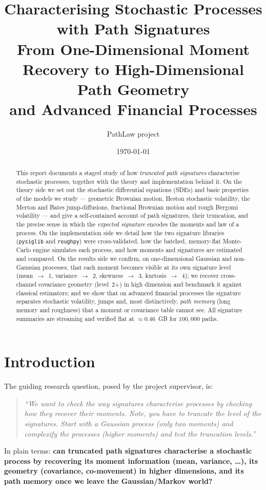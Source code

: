 \documentclass[11pt]{article}
\title{\textbf{Characterising Stochastic Processes with Path Signatures}\\[4pt]
\large From One-Dimensional Moment Recovery to High-Dimensional Path Geometry\\
and Advanced Financial Processes}
\author{PathLaw project}
\date{\today}
\newcommand{\code}[1]{\texttt{#1}}
\begin{document}
\maketitle

\begin{abstract}
This report documents a staged study of how \emph{truncated path signatures}
characterise stochastic processes, together with the theory and implementation
behind it. On the theory side we set out the stochastic differential equations
(SDEs) and basic properties of the models we study --- geometric Brownian motion,
Heston stochastic volatility, the Merton and Bates jump-diffusions, fractional
Brownian motion and rough Bergomi volatility --- and give a self-contained account
of path signatures, their truncation, and the precise sense in which the
\emph{expected signature} encodes the moments and law of a process. On the
implementation side we detail how the two signature libraries (\code{pysiglib} and
\code{roughpy}) were cross-validated, how the batched, memory-flat Monte-Carlo
engine simulates each process, and how moments and signatures are estimated and
compared. On the results side we confirm, on one-dimensional Gaussian and
non-Gaussian processes, that each moment becomes visible at its own signature
level (mean~$\to$~1, variance~$\to$~2, skewness~$\to$~3, kurtosis~$\to$~4); we
recover cross-channel covariance geometry (level~2+) in high dimension and
benchmark it against classical estimators; and we show that on advanced financial
processes the signature separates stochastic volatility, jumps and, most
distinctively, \emph{path memory} (long memory and roughness) that a moment or
covariance table cannot see. All signature summaries are streaming and verified
flat at $\approx 0.46$~GB for $100{,}000$ paths.
\end{abstract}

\tableofcontents

\section{Introduction}
The guiding research question, posed by the project supervisor, is:
\begin{quote}
\emph{``We want to check the way signatures characterise processes by checking
how they recover their moments. Note, you have to truncate the level of the
signatures. Start with a Gaussian process (only two moments) and complexify the
processes (higher moments) and test the truncation levels.''}
\end{quote}
In plain terms: \textbf{can truncated path signatures characterise a stochastic
process by recovering its moment information (mean, variance, \ldots), its
geometry (covariance, co-movement) in higher dimensions, and its path memory once
we leave the Gaussian/Markov world?}
\end{document}
